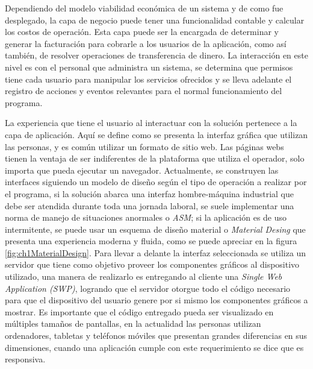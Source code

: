 Dependiendo del modelo viabilidad económica de un sistema y de como fue desplegado, la capa de negocio puede tener una funcionalidad contable y calcular los costos de operación.
Esta capa puede ser la encargada de determinar y generar la facturación para cobrarle a los usuarios de la aplicación, como así también, de resolver operaciones de transferencia de dinero.
La interacción en este nivel es con el personal que administra un sistema, se determina que permisos tiene cada usuario para manipular los servicios ofrecidos y se lleva adelante el registro de acciones y eventos relevantes para el normal funcionamiento del programa.

La experiencia que tiene el usuario al interactuar con la solución pertenece a la capa de aplicación.
Aquí se define como se presenta la interfaz gráfica que utilizan las personas, y es común utilizar un formato de sitio web.
Las páginas webs tienen la ventaja de ser indiferentes de la plataforma que utiliza el operador, solo importa que pueda ejecutar un navegador.
Actualmente, se construyen las interfaces siguiendo un modelo de diseño según el tipo de operación a realizar por el programa, si la solución abarca una interfaz hombre-máquina industrial que debe ser atendida durante toda una jornada laboral, se suele implementar una norma de manejo de situaciones anormales o \emph{ASM}; si la aplicación es de uso intermitente, se puede usar un esquema de diseño material o \emph{Material Desing} que presenta una experiencia moderna y fluida, como se puede apreciar en la figura \ref{fig:ch1MaterialDesign}.
Para llevar a delante la interfaz seleccionada se utiliza un servidor que tiene como objetivo proveer los componentes gráficos al dispositivo utilizado, una manera de realizarlo es entregando al cliente una \emph{Single Web Application (SWP)}, logrando que el servidor otorgue todo el código necesario para que el dispositivo del usuario genere por si mismo los componentes gráficos a mostrar.
Es importante que el código entregado pueda ser visualizado en múltiples tamaños de pantallas, en la actualidad las personas utilizan ordenadores, tabletas y teléfonos móviles que presentan grandes diferencias en sus dimensiones, cuando una aplicación cumple con este requerimiento se dice que es responsiva.


